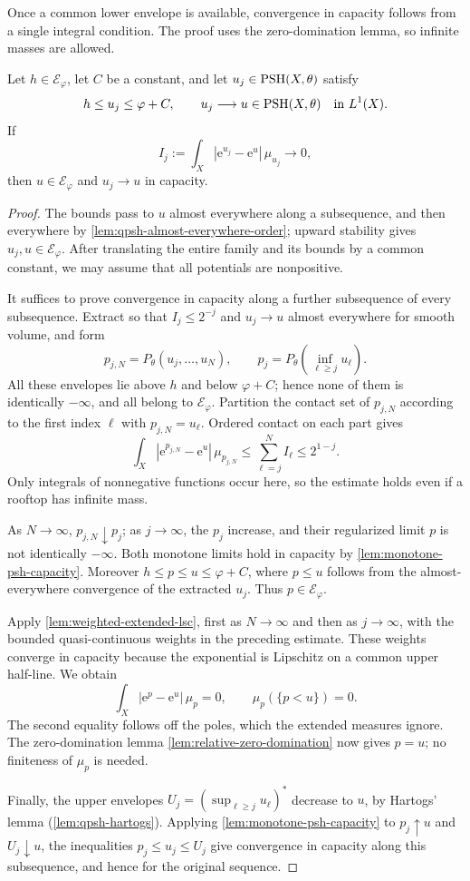 Once a common lower envelope is available, convergence in capacity follows from a single integral condition. The proof uses the zero-domination lemma, so infinite masses are allowed.

\begin{proposition}\label{prop:relative-common-envelope-criterion}
Let $h\in\mathcal E_\varphi$, let $C$ be a constant, and let $u_j\in\mathrm{PSH}(X,\theta)$ satisfy
\[
 h\leq u_j\leq\varphi+C,\qquad
 u_j\longrightarrow u\in\mathrm{PSH}(X,\theta)\quad\hbox{in }L^1(X).
\]
If
\[
 I_j:=\int_X|\mathrm{e}^{u_j}-\mathrm{e}^u|\,\mu_{u_j}\longrightarrow0,
\]
then $u\in\mathcal E_\varphi$ and $u_j\to u$ in capacity.
\end{proposition}
\begin{proof}
The bounds pass to $u$ almost everywhere along a subsequence, and then everywhere by \cref{lem:qpsh-almost-everywhere-order}; upward stability gives $u_j,u\in\mathcal E_\varphi$. After translating the entire family and its bounds by a common constant, we may assume that all potentials are nonpositive.

It suffices to prove convergence in capacity along a further subsequence of every subsequence. Extract so that $I_j\leq2^{-j}$ and $u_j\to u$ almost everywhere for smooth volume, and form
\[
 p_{j,N}=P_\theta(u_j,\ldots,u_N),\qquad
 p_j=P_\theta\left(\inf_{\ell\geq j}u_\ell\right).
\]
All these envelopes lie above $h$ and below $\varphi+C$; hence none of them is identically $-\infty$, and all belong to $\mathcal E_\varphi$. Partition the contact set of $p_{j,N}$ according to the first index $\ell$ with $p_{j,N}=u_\ell$. Ordered contact on each part gives
\[
 \int_X|\mathrm{e}^{p_{j,N}}-\mathrm{e}^u|\,\mu_{p_{j,N}}
 \leq\sum_{\ell=j}^N I_\ell\leq2^{1-j}.
\]
Only integrals of nonnegative functions occur here, so the estimate holds even if a rooftop has infinite mass.

As $N\to\infty$, $p_{j,N}\downarrow p_j$; as $j\to\infty$, the $p_j$ increase, and their regularized limit $p$ is not identically $-\infty$. Both monotone limits hold in capacity by \cref{lem:monotone-psh-capacity}. Moreover $h\leq p\leq u\leq\varphi+C$, where $p\leq u$ follows from the almost-everywhere convergence of the extracted $u_j$. Thus $p\in\mathcal E_\varphi$.

Apply \cref{lem:weighted-extended-lsc}, first as $N\to\infty$ and then as $j\to\infty$, with the bounded quasi-continuous weights in the preceding estimate. These weights converge in capacity because the exponential is Lipschitz on a common upper half-line. We obtain
\[
 \int_X|\mathrm{e}^p-\mathrm{e}^u|\,\mu_p=0,
 \qquad \mu_p(\{p<u\})=0.
\]
The second equality follows off the poles, which the extended measures ignore. The zero-domination lemma \cref{lem:relative-zero-domination} now gives $p=u$; no finiteness of $\mu_p$ is needed.

Finally, the upper envelopes $U_j=(\sup_{\ell\geq j}u_\ell)^*$ decrease to $u$, by Hartogs' lemma (\cref{lem:qpsh-hartogs}). Applying \cref{lem:monotone-psh-capacity} to $p_j\uparrow u$ and $U_j\downarrow u$, the inequalities $p_j\leq u_j\leq U_j$ give convergence in capacity along this subsequence, and hence for the original sequence.
\end{proof}

